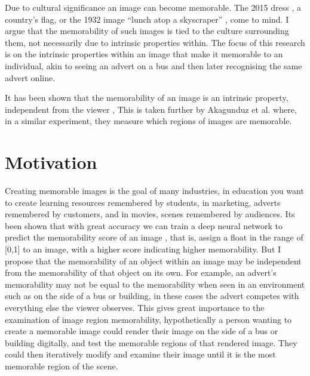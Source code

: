 \documentclass{UoYCSproject}
\begin{document}
Due to cultural significance an image can become memorable. The 2015 dress \cite{BBCDress2015}, a country's flag, or the 1932 image “lunch atop a skyscraper” \cite{gambino_2012}, come to mind. I argue that the memorability of such images is tied to the culture surrounding them, not necessarily due to intrinsic properties within. The focus of this research is on the intrinsic properties within an image that make it memorable to an individual, akin to seeing an advert on a bus and then later recognising the same advert online.



It has been shown that the memorability of an image is an intrinsic property, independent from the viewer \cite{Isola2011, IsolaParikhTorralbaOliva2011, ICCV15_Khosla, isola2014memorability}, This is taken further by Akagunduz et al. \cite{VischemaPaper} where, in a similar experiment, they measure which regions of images are memorable.

\section{Motivation}



Creating memorable images is the goal of many industries, in education you want to create learning resources remembered by students, in marketing, adverts remembered by customers, and in movies, scenes remembered by audiences.  Its been shown that with great accuracy we can train a deep neural network to predict the memorability score of an image \cite{Isola2011, IsolaParikhTorralbaOliva2011, ICCV15_Khosla, isola2014memorability},
that is, assign a float in the range of [0,1] to an image, with a higher score indicating higher memorability. But I propose that the memorability of an object within an image may be independent from the memorability of that object on its own. For example, an advert's memorability may not be equal to the memorability when seen in an environment such as on the side of a bus or building, in these cases the advert competes with everything else the viewer observes. This gives great importance to the examination of image region memorability, hypothetically a person wanting to create a memorable image could render their image on the side of a bus or building digitally, and test the memorable regions of that rendered image. They could then iteratively modify and examine their image until it is the most memorable region of the scene.
\end{document}

